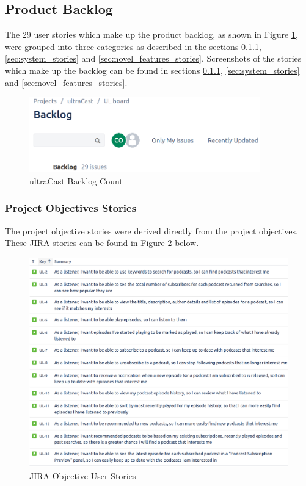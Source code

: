 \documentclass[12pt]{article}
\begin{document}
\subsection{Product Backlog}

The 29 user stories which make up the product backlog, as shown in Figure \ref{fig:backlog}, were grouped into three categories as described in the sections \ref{sec:project_objectives_stories}, \ref{sec:system_stories} and \ref{sec:novel_features_stories}.
Screenshots of the stories which make up the backlog can be found in sections \ref{sec:project_objectives_stories}, \ref{sec:system_stories} and \ref{sec:novel_features_stories}.

\begin{figure}[ht]
    \centering
    \includegraphics[width=10cm]{resources/project_backlog}
    \caption{ultraCast Backlog Count}
    \label{fig:backlog}
\end{figure}

\subsubsection{Project Objectives Stories} \label{sec:project_objectives_stories}

The project objective stories were derived directly from the project objectives. These JIRA stories can be found in Figure \ref{fig:jira_stories} below.

\begin{figure}[ht]
    \centering
    \includegraphics[width=\textwidth]{resources/objective_stories}
    \caption{JIRA Objective User Stories}
    \label{fig:jira_stories}
\end{figure}
\end{document}
